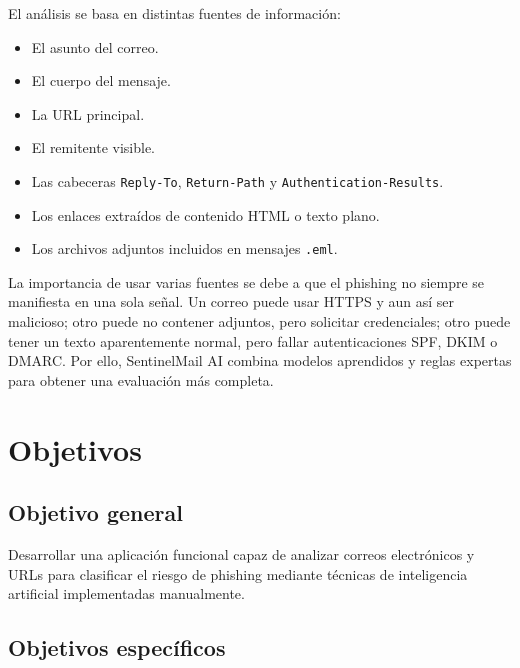 \documentclass[12pt,letterpaper]{article}
\begin{document}
El análisis se basa en distintas fuentes de información:

\begin{itemize}
    \item El asunto del correo.
    \item El cuerpo del mensaje.
    \item La URL principal.
    \item El remitente visible.
    \item Las cabeceras \texttt{Reply-To}, \texttt{Return-Path} y \texttt{Authentication-Results}.
    \item Los enlaces extraídos de contenido HTML o texto plano.
    \item Los archivos adjuntos incluidos en mensajes \texttt{.eml}.
\end{itemize}

La importancia de usar varias fuentes se debe a que el phishing no siempre se manifiesta en una sola señal. Un correo puede usar HTTPS y aun así ser malicioso; otro puede no contener adjuntos, pero solicitar credenciales; otro puede tener un texto aparentemente normal, pero fallar autenticaciones SPF, DKIM o DMARC. Por ello, SentinelMail AI combina modelos aprendidos y reglas expertas para obtener una evaluación más completa.

\section{Objetivos}

\subsection{Objetivo general}

Desarrollar una aplicación funcional capaz de analizar correos electrónicos y URLs para clasificar el riesgo de phishing mediante técnicas de inteligencia artificial implementadas manualmente.

\subsection{Objetivos específicos}
\end{document}
